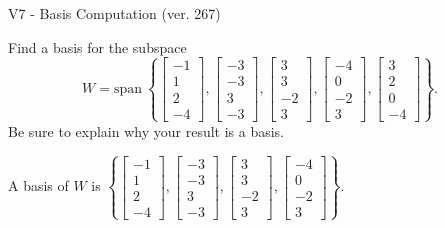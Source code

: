 \begin{exercise}
  \begin{exerciseTitle}V7 - Basis Computation (ver. 267)\end{exerciseTitle}
  \begin{exerciseStatement}
    Find a basis for the subspace 
\[W=\mathrm{span}\ \left\{\left[\begin{array}{r}
-1 \\
1 \\
2 \\
-4
\end{array}\right] , \left[\begin{array}{r}
-3 \\
-3 \\
3 \\
-3
\end{array}\right] , \left[\begin{array}{r}
3 \\
3 \\
-2 \\
3
\end{array}\right] , \left[\begin{array}{r}
-4 \\
0 \\
-2 \\
3
\end{array}\right] , \left[\begin{array}{r}
3 \\
2 \\
0 \\
-4
\end{array}\right]\right\}.\]
 Be sure to explain why your result is a basis.


  \end{exerciseStatement}
  \begin{exerciseAnswer}
   A basis of \(W\) is  \(\left\{\left[\begin{array}{r}
-1 \\
1 \\
2 \\
-4
\end{array}\right] , \left[\begin{array}{r}
-3 \\
-3 \\
3 \\
-3
\end{array}\right] , \left[\begin{array}{r}
3 \\
3 \\
-2 \\
3
\end{array}\right] , \left[\begin{array}{r}
-4 \\
0 \\
-2 \\
3
\end{array}\right]\right\}\).
  


  \end{exerciseAnswer}
\end{exercise}